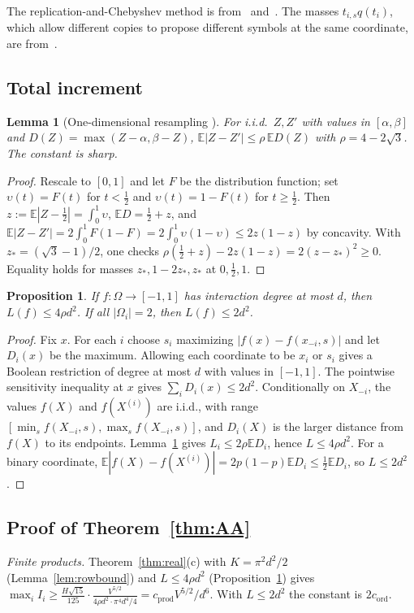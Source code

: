 \documentclass[11pt]{article}
\numberwithin{equation}{section}
\newtheorem{lemma}[theorem]{Lemma}
\newtheorem{proposition}[theorem]{Proposition}
\theoremstyle{definition}
\theoremstyle{remark}
\newcommand{\E}{\mathbb{E}}
\newcommand{\1}{\mathbf 1}
\newcommand{\cprod}{c_{\mathrm{prod}}}
\newcommand{\cord}{c_{\mathrm{ord}}}
\begin{document}
The replication-and-Chebyshev method is from~\cite[Section~6]{Tur26} and~\cite{ABD24}. The masses $t_{i,s}q(t_i)$, which allow different copies to propose different symbols at the same coordinate, are from~\cite{Wri26}.

\subsection{Total increment}
\begin{lemma}[One-dimensional resampling {\cite{Wri26}}]\label{lem:rho}
For i.i.d.\ $Z,Z'$ with values in $[\alpha,\beta]$ and $D(Z)=\max(Z-\alpha,\beta-Z)$, $\E|Z-Z'|\le\rho\,\E D(Z)$ with $\rho=4-2\sqrt3$. The constant is sharp.
\end{lemma}
\begin{proof}
Rescale to $[0,1]$ and let $F$ be the distribution function; set $\upsilon(t)=F(t)$ for $t<\frac12$ and $\upsilon(t)=1-F(t)$ for $t\ge\frac12$. Then $z:=\E|Z-\frac12|=\int_0^1\upsilon$, $\E D=\frac12+z$, and $\E|Z-Z'|=2\int_0^1F(1-F)=2\int_0^1\upsilon(1-\upsilon)\le2z(1-z)$ by concavity. With $z_*=(\sqrt3-1)/2$, one checks $\rho(\frac12+z)-2z(1-z)=2(z-z_*)^2\ge0$. Equality holds for masses $z_*,1-2z_*,z_*$ at $0,\frac12,1$.
\end{proof}

\begin{proposition}\label{prop:L}
If $f:\Omega\to[-1,1]$ has interaction degree at most $d$, then $L(f)\le4\rho d^2$. If all $|\Omega_i|=2$, then $L(f)\le2d^2$.
\end{proposition}
\begin{proof}
Fix $x$. For each $i$ choose $s_i$ maximizing $|f(x)-f(x_{-i},s)|$ and let $D_i(x)$ be the maximum. Allowing each coordinate to be $x_i$ or $s_i$ gives a Boolean restriction of degree at most $d$ with values in $[-1,1]$. The pointwise sensitivity inequality at $x$ gives $\sum_iD_i(x)\le2d^2$. Conditionally on $X_{-i}$, the values $f(X)$ and $f(X^{(i)})$ are i.i.d., with range $[\min_sf(X_{-i},s),\max_sf(X_{-i},s)]$, and $D_i(X)$ is the larger distance from $f(X)$ to its endpoints. Lemma~\ref{lem:rho} gives $L_i\le2\rho\E D_i$, hence $L\le4\rho d^2$. For a binary coordinate, $\E|f(X)-f(X^{(i)})|=2p(1-p)\E D_i\le\frac12\E D_i$, so $L\le2d^2$.
\end{proof}

\subsection{Proof of Theorem~\ref{thm:AA}}
\emph{Finite products.} Theorem~\ref{thm:real}(c) with $K=\pi^2d^2/2$ (Lemma~\ref{lem:rowbound}) and $L\le4\rho d^2$ (Proposition~\ref{prop:L}) gives $\max_iI_i\ge\frac{H\sqrt{15}}{125}\cdot\frac{V^{5/2}}{4\rho d^2\cdot\pi^4d^4/4}=\cprod V^{5/2}/d^6$. With $L\le2d^2$ the constant is $2\cord$.
\end{document}

